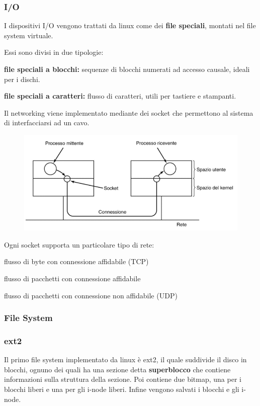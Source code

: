 \subsubsection{I/O}
I dispositivi I/O vengono trattati da linux come dei \textbf{file speciali}, montati nel file system virtuale.

\spacer
Essi sono divisi in due tipologie:
\begin{sitemize}
    \item \textbf{file speciali a blocchi:} sequenze di blocchi numerati ad accesso causale, ideali per i dischi.
    \item \textbf{file speciali a caratteri:} flusso di caratteri, utili per tastiere e stampanti.
\end{sitemize}

\spacer
Il networking viene implementato mediante dei socket che permettono al sistema di interfacciarsi ad un cavo.

\begin{figure}[H]
    \centering
    \includegraphics[width=0.5\linewidth]{assets/linux-socket.png}
\end{figure}

Ogni socket supporta un particolare tipo di rete:
\begin{sitemize}
    \item flusso di byte con connessione affidabile (TCP)
    \item flusso di pacchetti con connessione affidabile
    \item flusso di pacchetti con connessione non affidabile (UDP)
\end{sitemize}

\subsubsection{File System}

\subsubsection{ext2}
Il primo file system implementato da linux è ext2, il quale suddivide il disco in blocchi, ognuno dei quali ha una sezione detta \textbf{superblocco} che contiene informazioni sulla struttura della sezione.
Poi contiene due bitmap, una per i blocchi liberi e una per gli i-node liberi.
Infine vengono salvati i blocchi e gli i-node.

